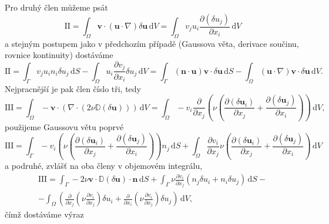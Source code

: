Pro druhý člen můžeme psát
\begin{equation*}
\mathrm{II}
=
\int_{\Omega} 
\mathbf{v}\cdot(\mathbf{u}\cdot \nabla)\delta\mathbf{u}
\, \mathrm{d}V
=
\int_{\Omega} 
v_j  u_i \frac{\partial (\delta u_j)}{\partial x_i}
\, \mathrm{d}V
\end{equation*}
a stejným postupem jako v předchozím případě (Gaussova věta, derivace součinu, rovnice kontinuity) dostáváme
\begin{equation}\label{eq:clen_II}
\mathrm{II}
=
\int_{\Gamma} 
v_j u_i n_i \delta u_j  
\, \mathrm{d}S
-
\int_{\Omega} 
u_i \frac{\partial v_j  }{\partial x_i} \delta u_j
\, \mathrm{d}V
=
\int_{\Gamma} 
(\mathbf{n} \cdot \mathbf{u}) \mathbf{v}\cdot \delta \mathbf{u} 
\, \mathrm{d}S
-
\int_{\Omega} 
(\mathbf{u} \cdot \nabla)\mathbf{v}\cdot \delta \mathbf{u}
\, \mathrm{d}V.
\end{equation}
Nejpracnější je pak člen číslo tři, tedy
\begin{equation*}
\mathrm{III}
=
\int_{\Omega} 
-\mathbf{v}\cdot \left(\nabla \cdot (2\nu \mathbb{D}(\delta \mathbf{u}) )\right)
\, \mathrm{d}V
=
\int_{\Omega} 
- v_i \frac{\partial}{\partial x_j} \left(  \nu
\left(\frac{\partial (\delta \mathbf{u}_i)}{\partial x_j} + 
\frac{\partial (\delta \mathbf{u}_j)}{\partial x_i}\right)
\right)
\, \mathrm{d}V,
\end{equation*}
použijeme Gaussovu větu poprvé
\begin{equation*}
\mathrm{III}
=
\int_{\Gamma} 
- v_i \left(  \nu
\left(\frac{\partial (\delta \mathbf{u}_i)}{\partial x_j} + 
\frac{\partial (\delta \mathbf{u}_j)}{\partial x_i}\right)
\right) n_j
\, \mathrm{d}S
+
\int_{\Omega} 
\frac{\partial v_i}{\partial x_j}   \nu
\left(\frac{\partial (\delta \mathbf{u}_i)}{\partial x_j} + 
\frac{\partial (\delta \mathbf{u}_j)}{\partial x_i}\right)
\, \mathrm{d}V
\end{equation*}
a podruhé, zvlášť na oba členy v objemovém integrálu,
\begin{multline*}
\mathrm{III}
=
\int_{\Gamma} 
- 2\nu \mathbf{v} \cdot  \mathbb{D}(\delta \mathbf{u})\cdot \mathbf{n}
\, \mathrm{d}S
+
\int_{\Gamma} 
\nu \frac{\partial v_i}{\partial x_j}
(n_j \delta u_i + n_i \delta u_j)
\, \mathrm{d}S
-\\-
\int_{\Omega} 
\left(\frac{\partial}{\partial x_j}\left( \nu \frac{\partial v_i}{\partial x_j} \right) \delta u_i + \frac{\partial}{\partial x_i}\left( \nu \frac{\partial v_i}{\partial x_j} \right) \delta u_j\right)
\, \mathrm{d}V,
\end{multline*}
čímž dostáváme výraz
